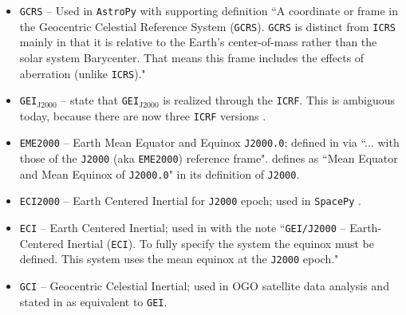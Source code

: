 \documentclass[draft]{agujournal2019}
\begin{document}
\begin{itemize}
    \item \texttt{GCRS} --  Used in \texttt{AstroPy} \cite{AstroPy2022} with supporting definition ``A coordinate or frame in the Geocentric Celestial Reference System (\texttt{GCRS}). \texttt{GCRS} is distinct from \texttt{ICRS} mainly in that it is relative to the Earth’s center-of-mass rather than the solar system Barycenter. That means this frame includes the effects of aberration (unlike \texttt{ICRS})."

    \item \texttt{GEI}$_\mathrm{J2000}$ --  state that \texttt{GEI}$_\mathrm{J2000}$ is realized through the \texttt{ICRF}. This is ambiguous today, because there are now three \texttt{ICRF} versions \cite{Charlot2020}.

    \item \texttt{EME2000} -- Earth Mean Equator and Equinox \texttt{J2000.0}; defined in  via ``... with those of the \texttt{J2000} (aka \texttt{EME2000}) reference frame".  defines as ``Mean Equator and Mean Equinox of \texttt{J2000.0}" in its definition of \texttt{J2000}.

    \item \texttt{ECI2000} -- Earth Centered Inertial for \texttt{J2000} epoch; used in \texttt{SpacePy} \cite{Niehof2022}.

    \item \texttt{ECI} -- Earth Centered Inertial; used in  with the note ``\texttt{GEI/J2000} – Earth-Centered Inertial (\texttt{ECI}). To fully specify the system the equinox must be defined. This system uses the mean equinox at the \texttt{J2000} epoch."
    
    
   \item \texttt{GCI} -- Geocentric Celestial Inertial; used in OGO satellite data analysis \cite{NASA1970} and stated in  as equivalent to \texttt{GEI}.


     

\end{itemize}
\end{document}
